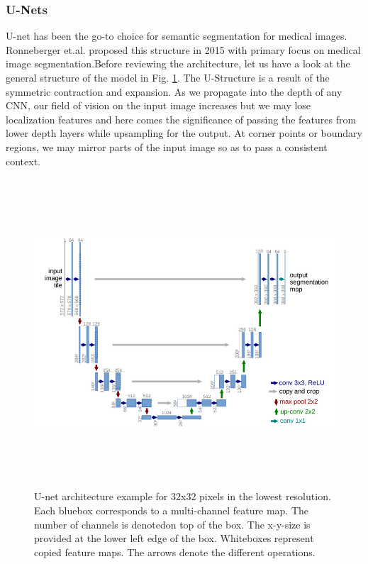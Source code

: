 \documentclass[19pt]{article}
\begin{document}
\subsubsection{U-Nets}
U-net has been the go-to choice for semantic segmentation for medical images. Ronneberger et.al. \cite{ronneberger2015u} proposed this structure in 2015 with primary focus on medical image segmentation.Before reviewing the architecture, let us have a look at the general structure of the model in Fig. \ref{fig:6}. The U-Structure is a result of the symmetric contraction and expansion. As we propagate into the depth of any CNN, our field of vision on the input image increases but we may lose localization features and here comes the significance of passing the features from lower depth layers while upsampling for the output. At corner points or boundary regions, we may mirror parts of the input image so as to pass a consistent context. 
\begin{center}
    \begin{figure}[!h!t!b]
        \centerline{\includegraphics[width=135mm,height=115mm]{images/unet.png}}
        \caption{U-net architecture example for 32x32 pixels in the lowest resolution. Each bluebox corresponds to a multi-channel feature map. The number of channels is denotedon top of the box. The x-y-size is provided at the lower left edge of the box. Whiteboxes represent copied feature maps. The arrows denote the different operations.}
        \label{fig:6}
    \end{figure}
\end{center}
\end{document}
